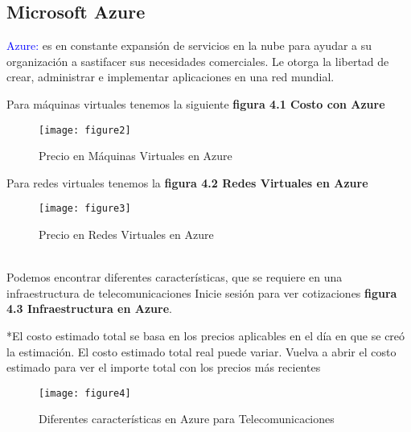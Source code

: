 \subsection{Microsoft Azure}

\textcolor{blue}{Azure:} es en constante expansión de servicios en la nube para ayudar a su organización a sastifacer sus necesidades comerciales. Le otorga la libertad de crear, administrar e implementar aplicaciones en una red mundial.

Para máquinas virtuales tenemos la siguiente \textbf{figura 4.1 Costo con Azure}

\begin{figure}[htbp]
  \centering
    {\texttt{[image: figure2]}}%
  \caption{Precio en Máquinas Virtuales en Azure}
  \label{fig:fig2subfig}
\end{figure}
Para redes virtuales tenemos la \textbf{figura 4.2 Redes Virtuales en Azure}
\begin{figure}[htbp]
  \centering
    {\texttt{[image: figure3]}}%
  \caption{Precio en Redes Virtuales en Azure}
  \label{fig:fig2subfig}
\end{figure}
%
\\
Podemos encontrar diferentes características, que se requiere en una infraestructura de telecomunicaciones 
Inicie sesión para ver cotizaciones  \textbf{figura 4.3 Infraestructura en Azure}.

*El costo estimado total se basa en los precios aplicables en el día en que se creó la estimación. El costo estimado total real puede variar. Vuelva a abrir el costo estimado para ver el importe total con los precios más recientes
\\
\begin{figure}[htbp]
  \centering
    {\texttt{[image: figure4]}}%
  \caption{Diferentes características en Azure para Telecomunicaciones}
  \label{fig:fig2subfig}
\end{figure}

